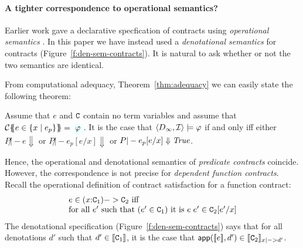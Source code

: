 
\paragraph{A tighter correspondence to operational semantics?}

Earlier work gave a declarative specfication of contracts using
\emph{operational semantics} \cite{xu+:contracts}.  In this paper we have
instead used a \emph{denotational semantics} for contracts (Figure~\ref{f:den-sem-contracts}).
It is natural to ask whether or not the two semantics are identical.

From computational adequacy, Theorem~\ref{thm:adequacy} we can easily state
the following theorem: 
\begin{corollary} Assume that $e$ and $\Ct$ contain no term variables and 
assume that $\ctrans{}{\cdot}{e \in \{x \mid e_p\}} = \formula{\phi}$. It is the case 
that $\langle D_\infty,{\cal I}\rangle \models \phi$ if and only iff either
$P \not|- e \Downarrow$ or $P \not|- e_p[e/x] \Downarrow$ or $P |- e_p[e/x] \Downarrow \True$. \end{corollary}
Hence, the operational and denotational semantics of \emph{predicate contracts} coincide.
However, the correspondence is not precise for \emph{dependent function contracts}.
Recall the operational definition of contract satisfaction for 
a function contract:
\[\begin{array}{l} 
   e \in (x{:}\Ct_1) -> \Ct_2 \text{ iff} \\
   \text{for all } e' \text{ such that } (e' \in \Ct_1) \text{ it is } e\;e' \in \Ct_2[e'/x]
\end{array}\] 
The denotational specification (Figure~\ref{f:den-sem-contracts}) 
says that for all denotations $d'$ such that
$d' \in \dbrace{\Ct_1}$, it is the case that 
$\dapp(\dbrace{e},d') \in \dbrace{\Ct_2}_{x |->d'}$. 
 
